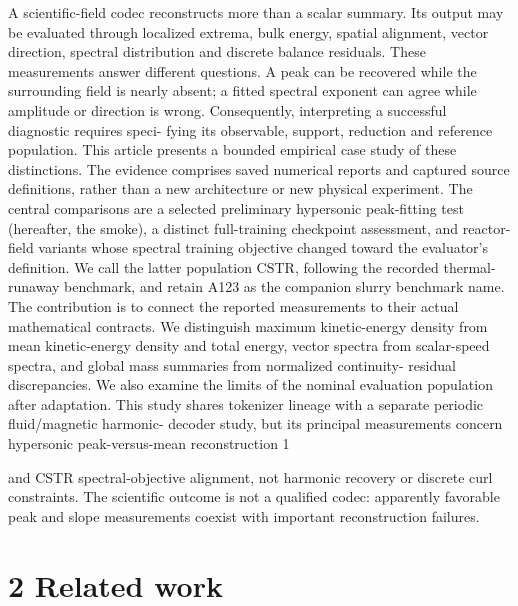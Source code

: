 \documentclass[11pt]{article}
\begin{document}
A scientific-field codec reconstructs more than a scalar summary. Its output may be evaluated
through localized extrema, bulk energy, spatial alignment, vector direction, spectral distribution
and discrete balance residuals. These measurements answer different questions. A peak can be
recovered while the surrounding field is nearly absent; a fitted spectral exponent can agree while
amplitude or direction is wrong. Consequently, interpreting a successful diagnostic requires speci-
fying its observable, support, reduction and reference population.
This article presents a bounded empirical case study of these distinctions. The evidence comprises
saved numerical reports and captured source definitions, rather than a new architecture or new
physical experiment. The central comparisons are a selected preliminary hypersonic peak-fitting
test (hereafter, the smoke), a distinct full-training checkpoint assessment, and reactor-field variants
whose spectral training objective changed toward the evaluator’s definition. We call the latter
population CSTR, following the recorded thermal-runaway benchmark, and retain A123 as the
companion slurry benchmark name.
The contribution is to connect the reported measurements to their actual mathematical contracts.
We distinguish maximum kinetic-energy density from mean kinetic-energy density and total energy,
vector spectra from scalar-speed spectra, and global mass summaries from normalized continuity-
residual discrepancies. We also examine the limits of the nominal evaluation population after
adaptation. This study shares tokenizer lineage with a separate periodic fluid/magnetic harmonic-
decoder study, but its principal measurements concern hypersonic peak-versus-mean reconstruction
1

and CSTR spectral-objective alignment, not harmonic recovery or discrete curl constraints. The
scientific outcome is not a qualified codec: apparently favorable peak and slope measurements
coexist with important reconstruction failures.

\section*{2 Related work}
\end{document}
